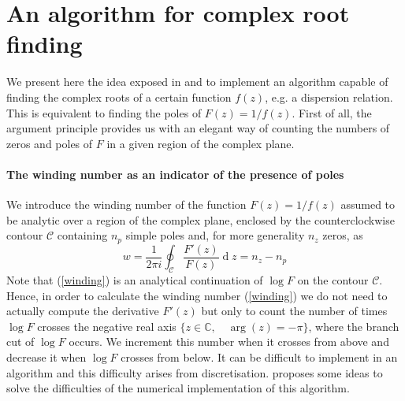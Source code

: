 \documentclass[11pt]{report}
\numberwithin{equation}{section}
\begin{document}
\section{An algorithm for complex root finding}
We present here the idea exposed in \cite{delves1967numerical} and \cite{brazier1991} to implement an algorithm capable of finding the complex roots of a certain function $f(z)$, e.g. a dispersion relation. This is equivalent to finding the poles of $F(z) = 1/f(z)$. First of all, the argument principle provides us with an elegant way of counting the numbers of zeros and poles of $F$ in a given region of the complex plane.\\

\paragraph{The winding number as an indicator of the presence of poles}
We introduce the winding number of the function $F(z) = 1/f(z)$ assumed to be analytic over a region of the complex plane, enclosed by the counterclockwise contour $\mathcal{C}$ containing $n_p$ simple poles and, for more generality $n_z$ zeros, as
%
\begin{equation} \label{winding}
    w = \frac{1}{2 \pi i}\oint_{\mathcal{C}} \frac{F'(z)}{F(z)} \operatorname{d}z = n_z - n_p
\end{equation}
%
Note that (\ref{winding}) is an analytical continuation of $\log F$ on the contour $\mathcal{C}$.\\

Hence, in order to calculate the winding number (\ref{winding}) we do not need to actually compute the derivative $F'(z)$ but only to count the number of times $\log F$ crosses the negative real axis $\{ z \in \mathbb{C}, \quad \operatorname{arg}(z) = - \pi \}$, where the branch cut of $\log F$ occurs. We increment this number when it crosses from above and decrease it when $\log F$ crosses from below. It can be difficult to implement in an algorithm and this difficulty arises from discretisation. \cite{delves1967numerical} proposes some ideas to solve the difficulties of the numerical implementation of this algorithm.\\
\end{document}
